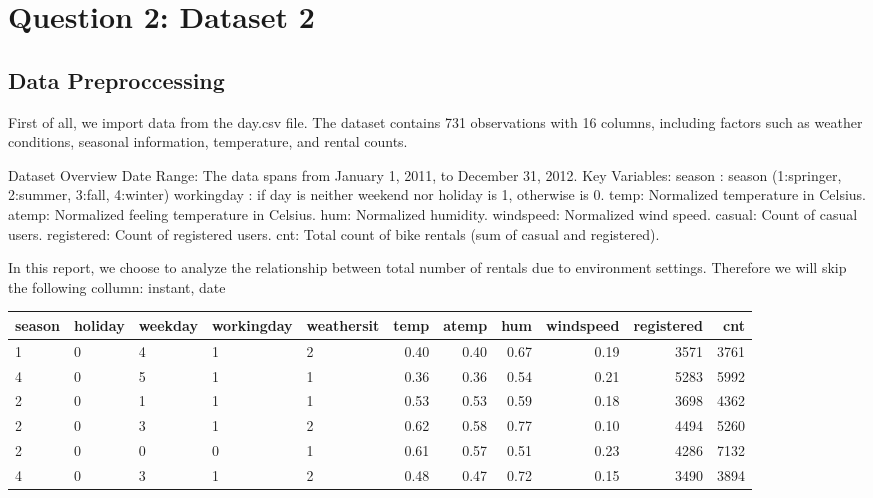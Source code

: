 \section{Question 2: Dataset 2}


\subsection{Data Preproccessing}

First of all, we import data from the day.csv file.
The dataset contains 731 observations with 16 columns, including factors such as weather conditions, seasonal information, temperature, and rental counts.

Dataset Overview Date Range: The data spans from January 1, 2011, to December 31, 2012.
Key Variables: season : season (1:springer, 2:summer, 3:fall, 4:winter) workingday : if day is neither weekend nor holiday is 1, otherwise is 0.
temp: Normalized temperature in Celsius.
atemp: Normalized feeling temperature in Celsius.
hum: Normalized humidity.
windspeed: Normalized wind speed.
casual: Count of casual users.
registered: Count of registered users.
cnt: Total count of bike rentals (sum of casual and registered).

In this report, we choose to analyze the relationship between total number of rentals due to environment settings.
Therefore we will skip the following collumn: instant, date


\begin{table}[ht]
\centering
\begin{tabular}{lllllrrrrrr}
  \hline
  season & holiday & weekday & workingday & weathersit & temp & atemp & hum & windspeed & registered & cnt \\ 
  \hline
 1 & 0 & 4 & 1 & 2 & 0.40 & 0.40 & 0.67 & 0.19 & 3571 & 3761 \\ 
   4 & 0 & 5 & 1 & 1 & 0.36 & 0.36 & 0.54 & 0.21 & 5283 & 5992 \\ 
   2 & 0 & 1 & 1 & 1 & 0.53 & 0.53 & 0.59 & 0.18 & 3698 & 4362 \\ 
   2 & 0 & 3 & 1 & 2 & 0.62 & 0.58 & 0.77 & 0.10 & 4494 & 5260 \\ 
   2 & 0 & 0 & 0 & 1 & 0.61 & 0.57 & 0.51 & 0.23 & 4286 & 7132 \\ 
   4 & 0 & 3 & 1 & 2 & 0.48 & 0.47 & 0.72 & 0.15 & 3490 & 3894 \\ 
   \hline
\end{tabular}
\end{table}

